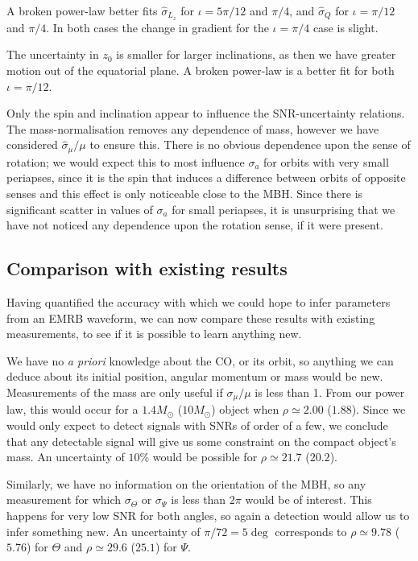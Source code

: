 \documentclass[useAMS,usedcolumn,usegraphicx,usenatbib]{mn2e}
\begin{document}
A broken power-law better fits $\hat{\sigma}_{L_z}$ for $\iota = 5\pi/12$ and $\pi/4$, and $\hat{\sigma}_Q$ for $\iota = \pi/12$ and $\pi/4$. In both cases the change in gradient for the $\iota = \pi/4$ case is slight.

The uncertainty in $z_0$ is smaller for larger inclinations, as then we have greater motion out of the equatorial plane. A broken power-law is a better fit for both $\iota = \pi/12$.

Only the spin and inclination appear to influence the SNR-uncertainty relations. The mass-normalisation removes any dependence of mass, however we have considered $\hat{\sigma}_\mu/\mu$ to ensure this. There is no obvious dependence upon the sense of rotation; we would expect this to most influence $\sigma_a$ for orbits with very small periapses, since it is the spin that induces a difference between orbits of opposite senses and this effect is only noticeable close to the MBH. Since there is significant scatter in values of $\sigma_a$ for small periapses, it is unsurprising that we have not noticed any dependence upon the rotation sense, if it were present.

\subsection{Comparison with existing results}

Having quantified the accuracy with which we could hope to infer parameters from an EMRB waveform, we can now compare these results with existing measurements, to see if it is possible to learn anything new.

We have no {\it a priori} knowledge about the CO, or its orbit, so anything we can deduce about its initial position, angular momentum or mass would be new. Measurements of the mass are only useful if $\sigma_\mu/\mu$ is less than 1. From our power law, this would occur for a $1.4 M_\odot$ ($10 M_\odot$) object when $\rho \simeq 2.00$ ($1.88$). Since we would only expect to detect signals with SNRs of order of a few, we conclude that any detectable signal will give us some constraint on the compact object's mass. An uncertainty of $10\%$ would be possible for $\rho \simeq 21.7$ ($20.2$).

Similarly, we have no information on the orientation of the MBH, so any measurement for which $\sigma_\Theta$ or $\sigma_\Psi$ is less than $2\pi$ would be of interest. This happens for very low SNR for both angles, so again a detection would allow us to infer something new. An uncertainty of $\pi/72 = 5\deg$ corresponds to $\rho \simeq 9.78$ ($5.76$) for $\Theta$ and $\rho \simeq 29.6$ ($25.1$) for $\Psi$.
\end{document}
